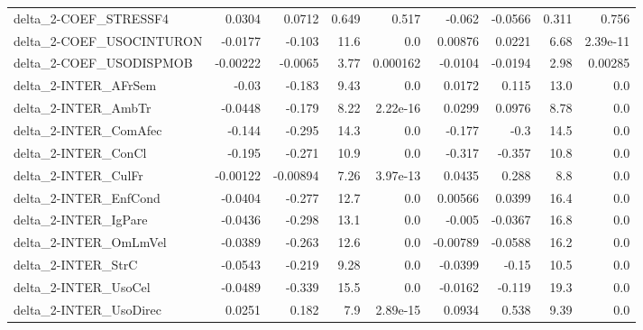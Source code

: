 \begin{tabular}{lrrrrrrrr}
delta\_2-COEF\_STRESSF4                  &      0.0304 &       0.0712 &   0.649 &    0.517 &     -0.062 &     -0.0566 &        0.311 &         0.756 \\
delta\_2-COEF\_USOCINTURON               &     -0.0177 &       -0.103 &    11.6 &      0.0 &    0.00876 &      0.0221 &         6.68 &      2.39e-11 \\
delta\_2-COEF\_USODISPMOB                &    -0.00222 &      -0.0065 &    3.77 & 0.000162 &    -0.0104 &     -0.0194 &         2.98 &       0.00285 \\
delta\_2-INTER\_AFrSem                   &       -0.03 &       -0.183 &    9.43 &      0.0 &     0.0172 &       0.115 &         13.0 &           0.0 \\
delta\_2-INTER\_AmbTr                    &     -0.0448 &       -0.179 &    8.22 & 2.22e-16 &     0.0299 &      0.0976 &         8.78 &           0.0 \\
delta\_2-INTER\_ComAfec                  &      -0.144 &       -0.295 &    14.3 &      0.0 &     -0.177 &        -0.3 &         14.5 &           0.0 \\
delta\_2-INTER\_ConCl                    &      -0.195 &       -0.271 &    10.9 &      0.0 &     -0.317 &      -0.357 &         10.8 &           0.0 \\
delta\_2-INTER\_CulFr                    &    -0.00122 &     -0.00894 &    7.26 & 3.97e-13 &     0.0435 &       0.288 &          8.8 &           0.0 \\
delta\_2-INTER\_EnfCond                  &     -0.0404 &       -0.277 &    12.7 &      0.0 &    0.00566 &      0.0399 &         16.4 &           0.0 \\
delta\_2-INTER\_IgPare                   &     -0.0436 &       -0.298 &    13.1 &      0.0 &     -0.005 &     -0.0367 &         16.8 &           0.0 \\
delta\_2-INTER\_OmLmVel                  &     -0.0389 &       -0.263 &    12.6 &      0.0 &   -0.00789 &     -0.0588 &         16.2 &           0.0 \\
delta\_2-INTER\_StrC                     &     -0.0543 &       -0.219 &    9.28 &      0.0 &    -0.0399 &       -0.15 &         10.5 &           0.0 \\
delta\_2-INTER\_UsoCel                   &     -0.0489 &       -0.339 &    15.5 &      0.0 &    -0.0162 &      -0.119 &         19.3 &           0.0 \\
delta\_2-INTER\_UsoDirec                 &      0.0251 &        0.182 &     7.9 & 2.89e-15 &     0.0934 &       0.538 &         9.39 &           0.0 \\

\end{tabular}
